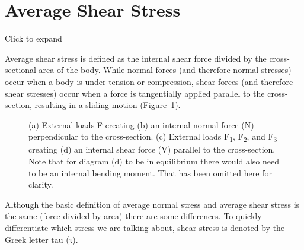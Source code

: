 \documentclass[
  letterpaper,
  DIV=11,
  numbers=noendperiod]{scrreprt}
\theoremstyle{definition}
\theoremstyle{remark}
\begin{document}
\section{Average Shear Stress}\label{sec-2.2}

Click to expand

Average shear stress is defined as the internal shear force divided by
the cross-sectional area of the body. While normal forces (and therefore
normal stresses) occur when a body is under tension or compression,
shear forces (and therefore shear stresses) occur when a force is
tangentially applied parallel to the cross-section, resulting in a
sliding motion (Figure~\ref{fig-2.3}).

\begin{figure}


\caption{\label{fig-2.3}(a) External loads F creating (b) an internal
normal force (N) perpendicular to the cross-section. (c) External loads
F\textsubscript{1}, F\textsubscript{2}, and F\textsubscript{3} creating
(d) an internal shear force (V) parallel to the cross-section. Note that
for diagram (d) to be in equilibrium there would also need to be an
internal bending moment. That has been omitted here for clarity.}

\end{figure}%

Although the basic definition of average normal stress and average shear
stress is the same (force divided by area) there are some differences.
To quickly differentiate which stress we are talking about, shear stress
is denoted by the Greek letter tau (τ).
\end{document}
